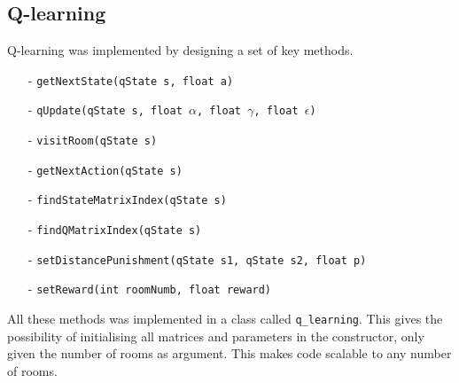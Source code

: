 \documentclass[../Head/Main.tex]{subfiles}
\begin{document}
\subsection{Q-learning}
Q-learning was implemented by designing a set of key methods.
\begin{itemize}
	\item[-] \texttt{getNextState(qState s, float a)} \vspace{-5pt}
	\item[-] \texttt{qUpdate(qState s, float $\alpha$, float $\gamma$, float $\epsilon$)} \vspace{-5pt}
	\item[-] \texttt{visitRoom(qState s)} \vspace{-5pt}
	\item[-] \texttt{getNextAction(qState s)} \vspace{-5pt}
	\item[-] \texttt{findStateMatrixIndex(qState s)} \vspace{-5pt} 
	\item[-] \texttt{findQMatrixIndex(qState s)} \vspace{-5pt}
	\item[-] \texttt{setDistancePunishment(qState s1, qState s2, float p)} \vspace{-5pt}
	\item[-] \texttt{setReward(int roomNumb, float reward)}
\end{itemize}


All these methods was implemented in a class called \texttt{q\_learning}. This gives the possibility of initialising all matrices and parameters in the constructor, only given the number of rooms as argument. This makes code scalable to any number of rooms.\\
\end{document}
